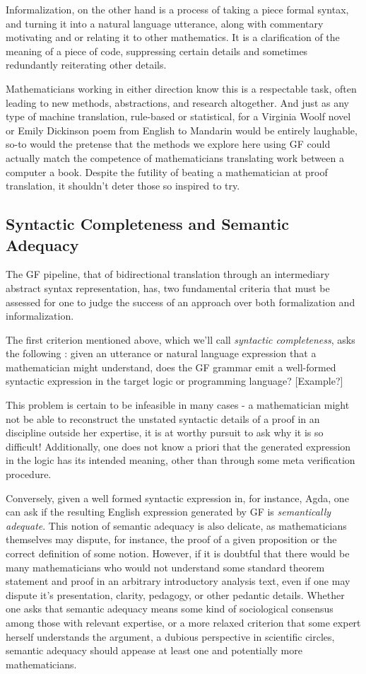 Informalization, on the other hand is a process of taking a piece formal syntax, and turning it into a natural
language utterance, along with commentary motivating and or relating it to other
mathematics. It is a clarification of the meaning of a piece of
code, suppressing certain details and  sometimes
redundantly reiterating other details.

Mathematicians working in either direction know this is a respectable task,
often leading to new methods, abstractions, and research altogether. And just as
any type of machine translation, rule-based or statistical, for a Virginia Woolf
novel or Emily Dickinson poem from English to Mandarin would be entirely
laughable, so-to would the pretense that the methods we explore here using GF
could actually match the competence of mathematicians translating work between a
computer a book. Despite the futility of beating a mathematician at proof
translation, it shouldn't deter those so inspired to try.

\subsection{Syntactic Completeness and Semantic Adequacy}

The GF pipeline, that of bidirectional translation through an intermediary
abstract syntax representation, has, two fundamental criteria that must be
assessed for one to judge the success of an approach over both formalization and
informalization.


The first criterion mentioned above, which we'll call \emph{syntactic completeness}, asks the
following : given an utterance or natural language expression that a
mathematician might understand, does the GF grammar emit a well-formed syntactic
expression in the target logic or programming language? [Example?]

This problem is certain to be infeasible in many cases - a mathematician might
not be able to reconstruct the unstated syntactic details of a proof in an
discipline outside her expertise, it is at worthy pursuit to ask why it is so
difficult! Additionally, one does not know a priori that the generated
expression in the logic has its intended meaning, other than through some meta
verification procedure.

Conversely, given a well formed syntactic expression in, for instance, Agda, one
can ask if the resulting English expression generated by GF is
\emph{semantically adequate}. This notion of semantic adequacy is also delicate,
as mathematicians themselves may dispute, for instance, the proof of a given
proposition or the correct definition of some notion. However, if it is doubtful
that there would be many mathematicians who would not understand some standard
theorem statement and proof in an arbitrary introductory analysis text, even if
one may dispute it's presentation, clarity, pedagogy, or other pedantic details.
Whether one asks that semantic adequacy means some kind of sociological
consensus among those with relevant expertise, or a more relaxed criterion that
some expert herself understands the argument, a dubious perspective in
scientific circles, semantic adequacy should appease at least one and
potentially more mathematicians.

